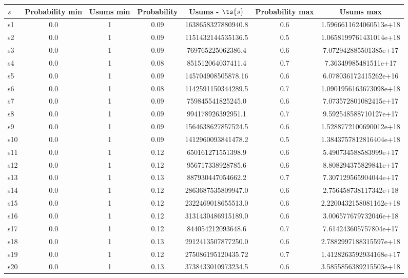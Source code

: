 \documentclass{article}
\begin{document}
\noindent\begin{tabular}{|l|c|c|c|c|c|c|}
\hline
$s$& Probability min & Usums min & Probability & Usums - $\ts{s}$ & Probability max & Usums max\\
\hline
s1 &0.0 & 1 & 0.09 & 1638658327880940.8 & 0.6 & 1.5966611624060513e+18\\
\hline
s2 &0.0 & 1 & 0.09 & 1151432144535136.5 & 0.5 & 1.0658199761431014e+18\\
\hline
s3 &0.0 & 1 & 0.09 & 769765225062386.4 & 0.6 & 7.072942885501385e+17\\
\hline
s4 &0.0 & 1 & 0.08 & 851512064037411.4 & 0.7 & 7.36349985481511e+17\\
\hline
s5 &0.0 & 1 & 0.09 & 145704908505878.16 & 0.6 & 6.078036172415262e+16\\
\hline
s6 &0.0 & 1 & 0.08 & 1142591150344289.5 & 0.7 & 1.0901956163673098e+18\\
\hline
s7 &0.0 & 1 & 0.09 & 759845541825245.0 & 0.6 & 7.073572801082415e+17\\
\hline
s8 &0.0 & 1 & 0.09 & 994178926392951.1 & 0.7 & 9.592548588710127e+17\\
\hline
s9 &0.0 & 1 & 0.09 & 1564638627857524.5 & 0.6 & 1.5288772100690012e+18\\
\hline
s10 &0.0 & 1 & 0.09 & 1412960093841478.2 & 0.5 & 1.3843757812816404e+18\\
\hline
s11 &0.0 & 1 & 0.12 & 650161271551398.9 & 0.6 & 5.490734588583999e+17\\
\hline
s12 &0.0 & 1 & 0.12 & 956717338928785.6 & 0.6 & 8.808294375829841e+17\\
\hline
s13 &0.0 & 1 & 0.13 & 887930447054662.2 & 0.7 & 7.307129565904044e+17\\
\hline
s14 &0.0 & 1 & 0.12 & 2863687535809947.0 & 0.6 & 2.756458738117342e+18\\
\hline
s15 &0.0 & 1 & 0.12 & 2322469018655513.0 & 0.6 & 2.2200432158081162e+18\\
\hline
s16 &0.0 & 1 & 0.12 & 3131430486915189.0 & 0.6 & 3.006577679732046e+18\\
\hline
s17 &0.0 & 1 & 0.12 & 844054212093648.6 & 0.7 & 7.614243605757804e+17\\
\hline
s18 &0.0 & 1 & 0.13 & 2912413507877250.0 & 0.6 & 2.7882997188315597e+18\\
\hline
s19 &0.0 & 1 & 0.12 & 275086195120435.72 & 0.7 & 1.4128263592934168e+17\\
\hline
s20 &0.0 & 1 & 0.13 & 3738433010973234.5 & 0.6 & 3.5855856389215503e+18\\

\end{tabular}
\end{document}
